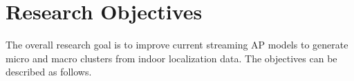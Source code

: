 







\section{Research Objectives}

The overall research goal is to improve current streaming AP models to generate micro and macro clusters from indoor localization data. The objectives can be described as follows. 


